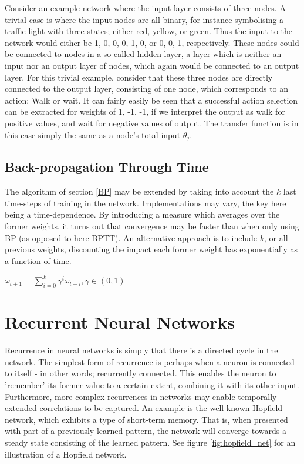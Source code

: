 Consider an example network where the input layer consists of three nodes. A trivial case is where the input nodes are all binary, for instance symbolising a traffic light with three states; either red, yellow, or green. Thus the input to the network would either be {1, 0, 0}, {0, 1, 0}, or {0, 0, 1}, respectively. These nodes could be connected to nodes in a so called hidden layer, a layer which is neither an input nor an output layer of nodes, which again would be connected to an output layer. For this trivial example, consider that these three nodes are directly connected to the output layer, consisting of one node, which corresponds to an action: Walk or wait. It can fairly easily be seen that a successful action selection can be extracted for weights of {1, -1, -1}, if we interpret the output as walk for positive values, and wait for negative values of output. The transfer function is in this case simply the same as a node's total input $\theta_j$.

\subsection{Back-propagation Through Time}

The algorithm of section \ref{BP} may be extended by taking into account the $k$ last time-steps of training in the network. Implementations may vary, the key here being a time-dependence. By introducing a measure which averages over the former weights, it turns out that convergence may be faster than when only using BP (as opposed to here BPTT). An alternative approach is to include $k$, or all previous weights, discounting the impact each former weight has exponentially as a function of time.

\begin{center}
\begin{math}
    \omega_{t+1} = \sum_{i=0}^{k}\gamma^i \omega_{t-i},
    \gamma \in (0, 1)
\end{math}
\end{center}

\section{Recurrent Neural Networks}

Recurrence in neural networks is simply that there is a directed cycle in the network. The simplest form of recurrence is perhaps when a neuron is connected to itself - in other words; recurrently connected. This enables the neuron to 'remember' its former value to a certain extent, combining it with its other input. Furthermore, more complex recurrences in networks may enable temporally extended correlations to be captured. An example is the well-known Hopfield network, which exhibits a type of short-term memory. That is, when presented with part of a previously learned pattern, the network will converge towards a steady state consisting of the learned pattern. See figure \ref{fig:hopfield_net} for an illustration of a Hopfield network.

